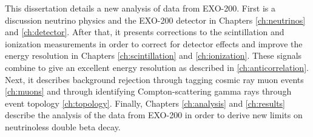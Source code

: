 \documentclass[herrin-thesis.tex]{subfiles}
\begin{document}
This dissertation details a new analysis of data from EXO-200. First is a discussion neutrino physics and the EXO-200 detector in Chapters \ref{ch:neutrinos} and \ref{ch:detector}. After that, it presents corrections to the scintillation and ionization measurements in order to correct for detector effects and improve the energy resolution in Chapters \ref{ch:scintillation} and \ref{ch:ionization}. These signals combine to give an excellent energy resolution as described in \ref{ch:anticorrelation}. Next, it describes background rejection through tagging cosmic ray muon events \ref{ch:muons} and through identifying Compton-scattering gamma rays through event topology \ref{ch:topology}. Finally, Chapters \ref{ch:analysis} and \ref{ch:results} describe the analysis of the data from EXO-200 in order to derive new limits on neutrinoless double beta decay. 
\end{document}
